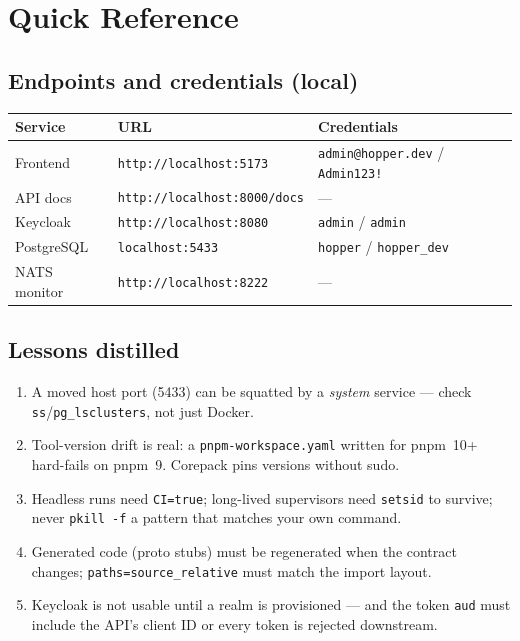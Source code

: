 \documentclass[11pt,a4paper]{article}
\newcommand{\code}[1]{\texttt{\small #1}}
\begin{document}
\section{Quick Reference}

\subsection{Endpoints and credentials (local)}

\begin{center}
\begin{tabular}{@{}lll@{}}
\toprule
\textbf{Service} & \textbf{URL} & \textbf{Credentials} \\
\midrule
Frontend      & \code{http://localhost:5173}       & \code{admin@hopper.dev} / \code{Admin123!} \\
API docs      & \code{http://localhost:8000/docs}  & --- \\
Keycloak      & \code{http://localhost:8080}       & \code{admin} / \code{admin} \\
PostgreSQL    & \code{localhost:5433}              & \code{hopper} / \code{hopper\_dev} \\
NATS monitor  & \code{http://localhost:8222}       & --- \\
\bottomrule
\end{tabular}
\end{center}

\subsection{Lessons distilled}

\begin{enumerate}[nosep]
  \item A moved host port (5433) can be squatted by a \emph{system} service ---
        check \code{ss}/\code{pg\_lsclusters}, not just Docker.
  \item Tool-version drift is real: a \code{pnpm-workspace.yaml} written for
        pnpm~10+ hard-fails on pnpm~9. Corepack pins versions without sudo.
  \item Headless runs need \code{CI=true}; long-lived supervisors need
        \code{setsid} to survive; never \code{pkill -f} a pattern that matches
        your own command.
  \item Generated code (proto stubs) must be regenerated when the contract
        changes; \code{paths=source\_relative} must match the import layout.
  \item Keycloak is not usable until a realm is provisioned --- and the
        token \code{aud} must include the API's client ID or every token is
        rejected downstream.
\end{enumerate}
\end{document}
